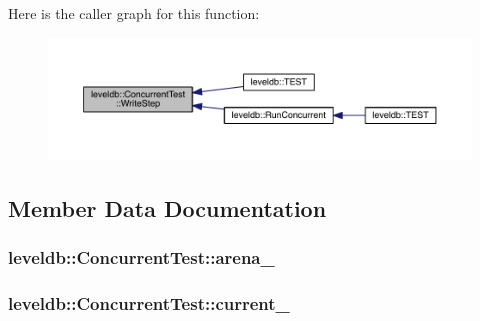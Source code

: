 Here is the caller graph for this function\+:\nopagebreak
\begin{figure}[H]
\begin{center}
\leavevmode
\includegraphics[width=350pt]{classleveldb_1_1_concurrent_test_a43dc8afb9124c364d6e97dc3d421131f_icgraph}
\end{center}
\end{figure}




\subsection{Member Data Documentation}
\hypertarget{classleveldb_1_1_concurrent_test_ae067606a3961c13de52700428dcbfd5c}{}
\subsubsection[{arena\+\_\+}]{ leveldb\+::\+Concurrent\+Test\+::arena\+\_\+\hspace{0.3cm}{\ttfamily [private]}}\label{classleveldb_1_1_concurrent_test_ae067606a3961c13de52700428dcbfd5c}
\hypertarget{classleveldb_1_1_concurrent_test_a11c5013d5af02237e637b6013efbdf8b}{}
\subsubsection[{current\+\_\+}]{ leveldb\+::\+Concurrent\+Test\+::current\+\_\+\hspace{0.3cm}{\ttfamily [private]}}\label{classleveldb_1_1_concurrent_test_a11c5013d5af02237e637b6013efbdf8b}
\hypertarget{classleveldb_1_1_concurrent_test_a7ec0efa701eb4bc34cff1f7a9c6ba6bd}{}
